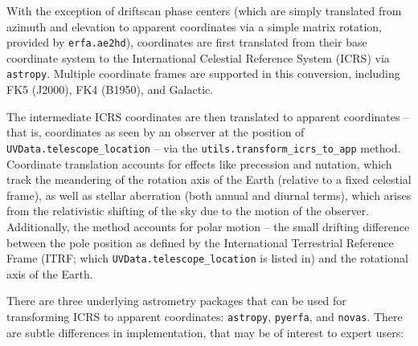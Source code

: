 \documentclass[11pt, oneside]{article}
\begin{document}
With the exception of driftscan phase centers (which are simply translated from azimuth and elevation to apparent coordinates via a simple matrix rotation, provided by \texttt{erfa.ae2hd}), coordinates are first translated from their base coordinate system to the International Celestial Reference System (ICRS) via \texttt{astropy}.  Multiple coordinate frames are supported in this conversion, including FK5 (J2000), FK4 (B1950), and Galactic.

The intermediate ICRS coordinates are then translated to apparent coordinates -- that is, coordinates as seen by an observer at the position of \texttt{UVData.telescope\_location} -- via the \texttt{utils.transform\_icrs\_to\_app} method. Coordinate translation accounts for effects like precession and nutation, which track the meandering of the rotation axis of the Earth (relative to a fixed celestial frame), as well as stellar aberration (both annual and diurnal terms), which arises from the relativistic shifting of the sky due to the motion of the observer. Additionally, the method accounts for polar motion -- the small drifting difference between the pole position as defined by the International Terrestrial Reference Frame (ITRF; which \texttt{UVData.telescope\_location} is listed in) and the rotational axis of the Earth.

There are three underlying astrometry packages that can be used for transforming ICRS to apparent coordinates: \texttt{astropy}, \texttt{pyerfa}, and \texttt{novas}.  There are subtle differences in implementation, that may be of interest to expert users:
\end{document}
